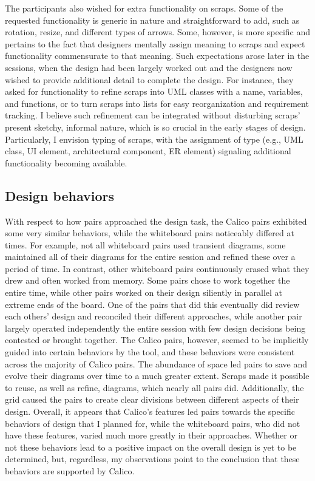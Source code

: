 \documentclass[12pt,fleqn]{ucithesis}
\begin{document}
The participants also wished for extra functionality on scraps. Some of the requested functionality is generic in nature and straightforward to add, such as rotation, resize, and different types of arrows. Some, however, is more specific and pertains to the fact that designers mentally assign meaning to scraps and expect functionality commensurate to that meaning. Such expectations arose later in the sessions, when the design had been largely worked out and the designers now wished to provide additional detail to complete the design. For instance, they asked for functionality to refine scraps into UML classes with a name, variables, and functions, or to turn scraps into lists for easy reorganization and requirement tracking. I believe such refinement can be integrated without disturbing scraps' present sketchy, informal nature, which is so crucial in the early stages of design. Particularly, I envision typing of scraps, with the assignment of type (e.g., UML class, UI element, architectural component, ER element) signaling additional functionality becoming available. 

\subsection {Design behaviors}
\label{discussion:2}

With respect to how pairs approached the design task, the Calico pairs exhibited some very similar behaviors, while the whiteboard pairs noticeably differed at times. For example, not all whiteboard pairs used transient diagrams, some maintained all of their diagrams for the entire session and refined these over a period of time. In contrast, other whiteboard pairs continuously erased what they drew and often worked from memory. Some pairs chose to work together the entire time, while other pairs worked on their design siliently in parallel at extreme ends of the board. One of the pairs that did this eventually did review each others' design and reconciled their different approaches, while another pair largely operated independently the entire session with few design decisions being contested or brought together. The Calico pairs, however, seemed to be implicitly guided into certain behaviors by the tool, and these behaviors were consistent across the majority of Calico pairs. The abundance of space led pairs to save and evolve their diagrams over time to a much greater extent. Scraps made it possible to reuse, as well as refine, diagrams, which nearly all pairs did. Additionally, the grid caused the pairs to create clear divisions between different aspects of their design. Overall, it appears that Calico's features led pairs towards the specific behaviors of design that I planned for, while the whiteboard pairs, who did not have these features, varied much more greatly in their approaches. Whether or not these behaviors lead to a positive impact on the overall design is yet to be determined, but, regardless, my observations point to the conclusion that these behaviors are supported by Calico.
\end{document}
